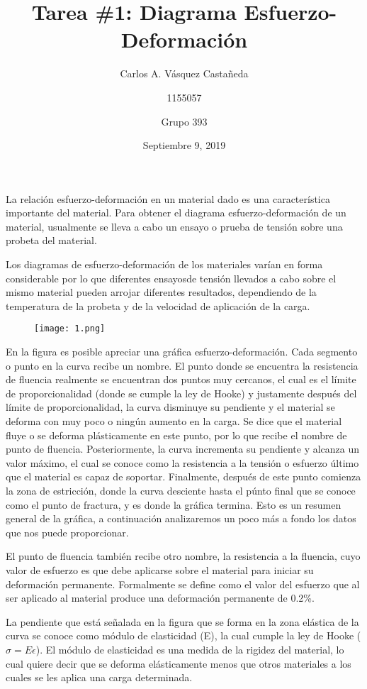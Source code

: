 \documentclass[12pt, letterpaper]{article}
\title{Tarea \#1: Diagrama Esfuerzo-Deformación}
\author{Carlos A. Vásquez Castañeda \and 1155057 \and Grupo 393}
\date{Septiembre 9, 2019}
\begin{document}
\maketitle
La relación esfuerzo-deformación en un material dado es una característica importante del material. Para obtener el diagrama esfuerzo-deformación de un material, usualmente se lleva a cabo un ensayo o prueba de tensión sobre una probeta del material.

Los diagramas de esfuerzo-deformación de los materiales varían en forma considerable por lo que diferentes ensayosde tensión llevados a cabo sobre el mismo material pueden arrojar diferentes resultados, dependiendo de la temperatura de la probeta y de la velocidad de aplicación de la carga.

\begin{figure}[H]
	\centering
	\texttt{[image: 1.png]}
\end{figure}

En la figura es posible apreciar una gráfica esfuerzo-deformación. Cada segmento o punto en la curva recibe un nombre. El punto donde se encuentra la resistencia de fluencia realmente se encuentran dos puntos muy cercanos, el cual es el límite de proporcionalidad (donde se cumple la ley de Hooke) y justamente después del límite de proporcionalidad, la curva disminuye su pendiente y el material se deforma con muy poco o ningún aumento en la carga. Se dice que el material fluye o se deforma plásticamente en este punto, por lo que recibe el nombre de punto de fluencia. Posteriormente, la curva incrementa su pendiente y alcanza un valor máximo, el cual se conoce como la resistencia a la tensión o esfuerzo último que el material es capaz de soportar. Finalmente, después de este punto comienza la zona de estricción, donde la curva desciente hasta el púnto final que se conoce como el punto de fractura, y es donde la gráfica termina. Esto es un resumen general de la gráfica, a continuación analizaremos un poco más a fondo los datos que nos puede proporcionar.

El punto de fluencia también recibe otro nombre, la resistencia a la fluencia, cuyo valor de esfuerzo es que debe aplicarse sobre el material para iniciar su deformación permanente. Formalmente se define como el valor del esfuerzo que al ser aplicado al material produce una deformación permanente de 0.2\%.

La pendiente que está señalada en la figura que se forma en la zona elástica de la curva se conoce como módulo de elasticidad (E), la cual cumple la ley de Hooke ($\sigma = E\epsilon$). El módulo de elasticidad es una medida de la rigidez del material, lo cual quiere decir que se deforma elásticamente menos que otros materiales a los cuales se les aplica una carga determinada.
\end{document}
